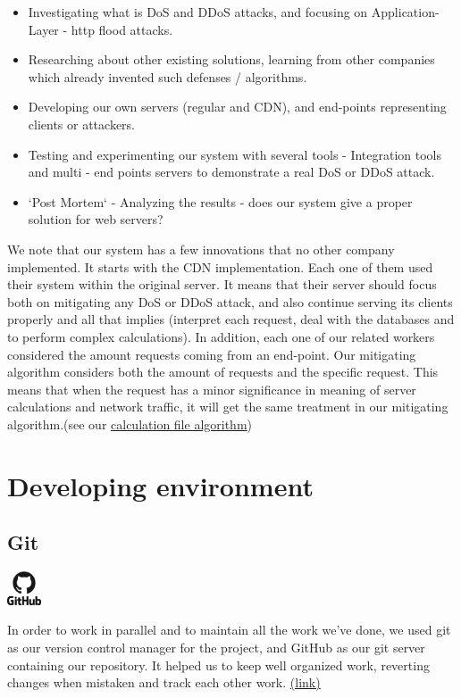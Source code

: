 \documentclass{report}
\begin{document}
\begin{itemize}

\item Investigating what is \gls{DoS} and \gls{DDoS} attacks, and focusing on Application-Layer - http flood attacks.
\item Researching about other existing solutions, learning from other companies which already invented such defenses / algorithms.
\item Developing our own servers (regular and \gls{CDN}), and end-points representing clients or attackers.
\item Testing and experimenting our system with several tools - Integration tools and multi - end points servers to demonstrate a real \gls{DoS} or \gls{DDoS} attack.
\item `Post Mortem` - Analyzing the results - does our system give a proper solution for web servers?

\end{itemize}

We note that our system has a few innovations that no other company implemented. It starts with the \gls{CDN} implementation. Each one of them used their system within the original server. It means that their server should focus both on mitigating any \gls{DoS} or \gls{DDoS} attack, and also continue serving its clients properly and all that implies (interpret each request, deal with the databases and to perform complex calculations).\hfill \break
In addition, each one of our related workers considered the amount requests coming from an end-point. Our mitigating algorithm considers both the amount of requests and the specific request. This means that when the request has a minor significance in meaning of server calculations and network traffic, it will get the same treatment in our mitigating algorithm.\hfill \break (see our \hyperref[sec:algo1]{calculation file algorithm})



\newpage
\section {Developing environment }

\subsection {Git}
     \begin{minipage}{\linewidth}
            \includegraphics[width=1cm,height=1cm,keepaspectratio]{github}
        \end{minipage}
\hfill \break
In order to work in parallel and to maintain all the work we’ve done, we used git as our version control manager for the project, and GitHub as our git server containing our repository. It helped us to keep well organized work, reverting changes when mistaken and track each other work. \href{https://github.com/}{(link)} 
\end{document}
